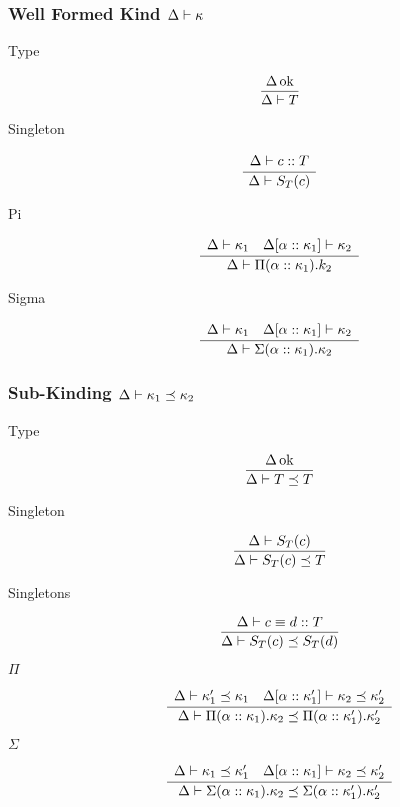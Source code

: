 \documentclass[12pt,twoside,fleqn]{amsart}
\theoremstyle{plain}
\theoremstyle{plain}
\theoremstyle{definition}
\begin{document}
\subsubsection{Well Formed Kind \protect\( \Delta  \vdash \kappa \protect \)}

\begin{description}
\item [Type]
\[
\frac{\Delta  \, \mathrm{ok} }{\Delta  \vdash T }\]

\item [Singleton]
\[
\frac{\begin{array}{ll}
\Delta  \vdash c  ::T 
\end{array} }{\Delta  \vdash S_{T}(c )  }\]

\item [Pi]
\[
\frac{\begin{array}{ll}
\Delta  \vdash \kappa _{1}  & \Delta  [\alpha   ::\kappa _{1}  ] \vdash \kappa _{2}
\end{array} }{\Delta  \vdash \Pi (\alpha ::\kappa _{1}).k_{2}  }\]

\item [Sigma]
\[
\frac{\begin{array}{ll}
\Delta  \vdash \kappa _{1}  & \Delta  [\alpha   ::\kappa _{1}  ] \vdash \kappa _{2}
\end{array} }{\Delta  \vdash \Sigma (\alpha  ::\kappa _{1}  ).\kappa _{2}   }\]

\end{description}

\subsubsection{Sub-Kinding \protect\( \Delta  \vdash \kappa _{1}   \preceq \kappa _{2}  \protect \)}

\begin{description}
\item [Type]
\[
\frac{\Delta  \, \mathrm{ok} }{\Delta  \vdash T  \preceq T  }\]

\item [Singleton]
\[
\frac{\Delta  \vdash S_{T}(c )  }{\Delta  \vdash S_{T}(c )  \preceq T  }\]

\item [Singletons]
\[
\frac{\Delta  \vdash c \equiv d ::T }{\Delta  \vdash S_{T}(c )  \preceq S_{T}(d )  }\]

\item [\( \Pi  \)]
\[
\frac{\begin{array}{ll}
\Delta  \vdash \kappa _{1} '  \preceq \kappa _{1}   & \Delta  [\alpha   ::\kappa _{1} '  ] \vdash \kappa _{2}  \preceq \kappa _{2} '
\end{array} }{\Delta  \vdash \Pi (\alpha  ::\kappa _{1}  ).\kappa _{2}   \preceq \Pi (\alpha  ::\kappa _{1} ' ).\kappa _{2} '  }\]

\item [\( \Sigma  \)]
\[
\frac{\begin{array}{ll}
\Delta  \vdash \kappa _{1}   \preceq \kappa _{1} '  & \Delta  [\alpha   ::\kappa _{1}   ] \vdash \kappa _{2}  \preceq \kappa _{2} '
\end{array} }{\Delta  \vdash \Sigma (\alpha  ::\kappa _{1}  ).\kappa _{2}   \preceq \Sigma (\alpha  ::\kappa _{1} ' ).\kappa _{2} '  }\]

\end{description}
\end{document}
